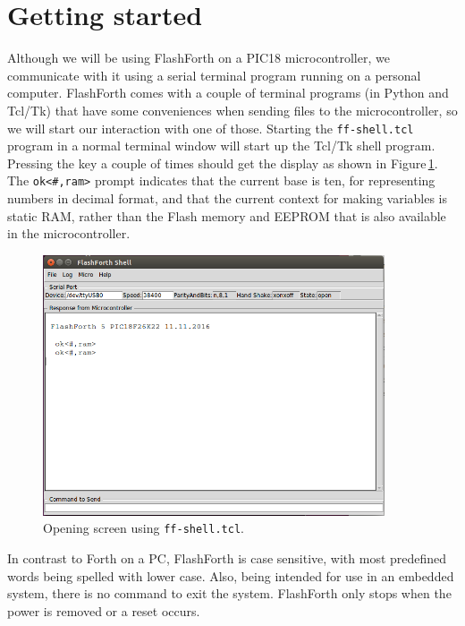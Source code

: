\documentclass[12pt,a4paper]{article}
\begin{document}
\newpage
\section{Getting started}
\label{sec:getting-started}
%
Although we will be using FlashForth on a PIC18 microcontroller, we communicate with it
using a serial terminal program running on a personal computer.
FlashForth comes with a couple of terminal programs (in Python and Tcl/Tk)
that have some conveniences when sending files to the microcontroller,
so we will start our interaction with one of those.
Starting the \verb!ff-shell.tcl! program in a normal terminal window
will start up the Tcl/Tk shell program.
Pressing the  key a couple of times should get the display 
as shown in Figure\,\ref{fig:opening-screen}.
The \verb!ok<#,ram>! prompt indicates that the current base is ten,
for representing numbers in decimal format, 
and that the current context for making variables is static RAM, 
rather than the Flash memory and EEPROM that is also available in the microcontroller.

\begin{figure}[htb]
 \centering
 \includegraphics[width=0.9\textwidth]{../figs/ff5-start-screen-ff-shell-tcl.png}
 \caption{Opening screen using \texttt{ff-shell.tcl}.}
 \label{fig:opening-screen}
\end{figure}

\medskip
In contrast to Forth on a PC, FlashForth is case sensitive, with most predefined words 
being spelled with lower case.
Also, being intended for use in an embedded system, there is no command to exit the system.
FlashForth only stops when the power is removed or a reset occurs.
\end{document}
